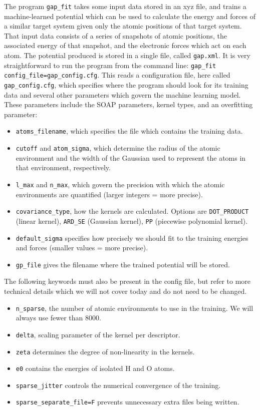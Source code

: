 \documentclass{article}
\begin{document}
The program \verb|gap_fit| takes some input data stored in an xyz file, and trains a machine-learned potential which can be used to calculate the energy and forces of a similar target system given only the atomic positions of that target system. That input data consists of a series of snapshots of atomic positions, the associated energy of that snapshot, and the electronic forces which act on each atom. The potential produced is stored in a single file, called \verb|gap.xml|. It is very straightforward to run the program from the command line: \verb|gap_fit config_file=gap_config.cfg|. This reads a configuration file, here called \verb|gap_config.cfg|, which specifies where the program should look for its training data and several other parameters which govern the machine learning model. These parameters include the SOAP parameters, kernel types, and an overfitting parameter:
\begin{itemize}

\item \verb|atoms_filename|, which specifies the file which contains the training data.
\item \verb|cutoff| and \verb|atom_sigma|, which determine the radius of the atomic environment and the width of the Gaussian used to represent the atoms in that environment, respectively.
\item \verb|l_max| and \verb|n_max|, which govern the precision with which the atomic environments are quantified (larger integers = more precise).
\item \verb|covariance_type|, how the kernels are calculated. Options are \verb|DOT_PRODUCT| (linear kernel), \verb|ARD_SE| (Gaussian kernel), \verb|PP| (piecewise polynomial kernel).
\item \verb|default_sigma| specifies how precisely we should fit to the training energies and forces (smaller values = more precise).
\item \verb|gp_file| gives the filename where the trained potential will be stored.

\end{itemize}

The following keywords must also be present in the config file, but refer to more technical details which we will not cover today and do not need to be changed.

\begin{itemize}
\item \verb|n_sparse|, the number of atomic environments to use in the training. We will always use fewer than 8000.
\item \verb|delta|, scaling parameter of the kernel per descriptor.
\item \verb|zeta| determines the degree of non-linearity in the kernels.
\item \verb|e0| contains the energies of isolated H and O atoms.
\item \verb|sparse_jitter| controls the numerical convergence of the training.
\item \verb|sparse_separate_file=F| prevents unnecessary extra files being written. 
\end{itemize}
\end{document}

